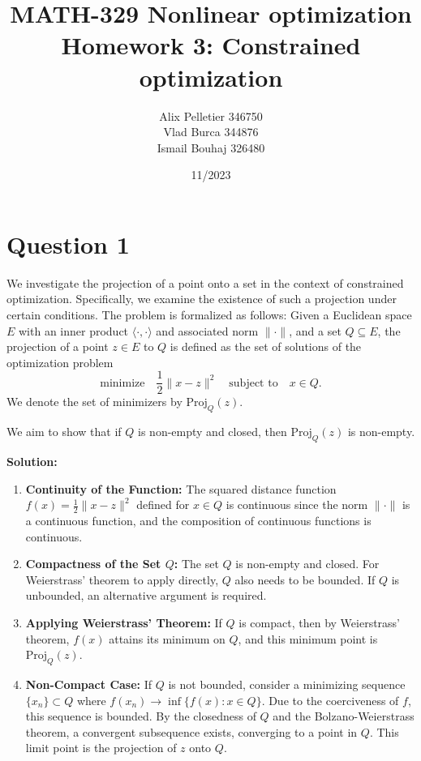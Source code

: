 \documentclass[12p]{article}
\title{MATH-329 Nonlinear optimization
Homework 3: Constrained optimization}
\author{Alix Pelletier 346750 \\ Vlad Burca 344876 \\ Ismail Bouhaj 326480}
\date{11/2023}
\begin{document}
\maketitle 
\section*{Question 1} 
We investigate the projection of a point onto a set in the context of constrained optimization. Specifically, we examine the existence of such a projection under certain conditions. The problem is formalized as follows: Given a Euclidean space \( E \) with an inner product \( \langle \cdot, \cdot \rangle \) and associated norm \( \lVert \cdot \rVert \), and a set \( Q \subseteq E \), the projection of a point \( z \in E \) to \( Q \) is defined as the set of solutions of the optimization problem
\begin{equation}
    \text{minimize}\quad \frac{1}{2} \lVert x - z \rVert^2 \quad \text{subject to} \quad x \in Q.
\end{equation}
We denote the set of minimizers by \( \text{Proj}_Q(z) \).

We aim to show that if \( Q \) is non-empty and closed, then \( \text{Proj}_Q(z) \) is non-empty.

\textbf{Solution:}

\begin{enumerate}

    \item \textbf{Continuity of the Function:} The squared distance function \( f(x) = \frac{1}{2} \lVert x - z \rVert^2 \)  defined for \( x \in Q \)  is continuous since the norm \( \lVert \cdot \rVert \) is a continuous function, and the composition of continuous functions is continuous.

    \item \textbf{Compactness of the Set \( Q \):} The set \( Q \) is non-empty and closed. For Weierstrass' theorem to apply directly, \( Q \) also needs to be bounded. If \( Q \) is unbounded, an alternative argument is required.

    \item \textbf{Applying Weierstrass' Theorem:} If \( Q \) is compact, then by Weierstrass' theorem, \( f(x) \) attains its minimum on \( Q \), and this minimum point is \( \text{Proj}_Q(z) \).

    \item \textbf{Non-Compact Case:} If \( Q \) is not bounded, consider a minimizing sequence \( \{x_n\} \subset Q \) where \( f(x_n) \rightarrow \inf \{ f(x) : x \in Q \} \). Due to the coerciveness of \( f \), this sequence is bounded. By the closedness of \( Q \) and the Bolzano-Weierstrass theorem, a convergent subsequence exists, converging to a point in \( Q \). This limit point is the projection of \( z \) onto \( Q \).
\end{enumerate}
\end{document}
